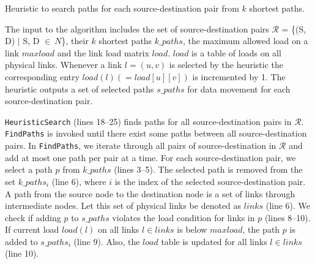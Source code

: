 \begin{algorithm}%
\SetAlgoLined\DontPrintSemicolon
{}
\BlankLine
\caption{Heuristic to search paths for each source-destination pair from $k$ shortest paths.}
\label{alg:heu}
\end{algorithm}

The input to the algorithm includes the set of source-destination pairs $\mathcal{R}$ = \{(S, D) $|$ S, D $\in~N$\}, their $k$ shortest paths {$k\_paths$}, the maximum allowed load on a link $maxload$ and the link load matrix $load$. $load$ is a table of loads on all physical links. Whenever a link $l=(u,v)$ is selected by the heuristic the corresponding entry $load(l) (= load[u][v])$ is incremented by 1. The heuristic outputs a set of selected paths $s\_paths$ for data movement for each source-destination pair. 

\texttt{HeuristicSearch} (lines 18--25) finds paths for all source-destination pairs in $\mathcal{R}$. \texttt{FindPaths} is invoked until there exist some paths between all source-destination pairs. In \texttt{FindPaths}, we iterate through all pairs of source-destination in $\mathcal{R}$ and add at most one path per pair at a time. For each source-destination pair, we select a path $p$ from $k\_paths$ (lines 3--5). The selected path is removed from the set $k\_paths_i$ (line 6), where $i$ is the index of the selected source-destination pair. A path from the source node to the destination node is a set of links through intermediate nodes. Let this set of physical links be denoted as $links$ (line 6). We check if adding $p$ to $s\_paths$ violates the load condition for links in $p$ (lines 8--10). If current load $load(l)$ on all links $l \in links$ is below $maxload$, the path $p$ is added to $s\_paths_i$ (line 9). Also, the $load$ table is updated for all links $l \in links$ (line 10). 

